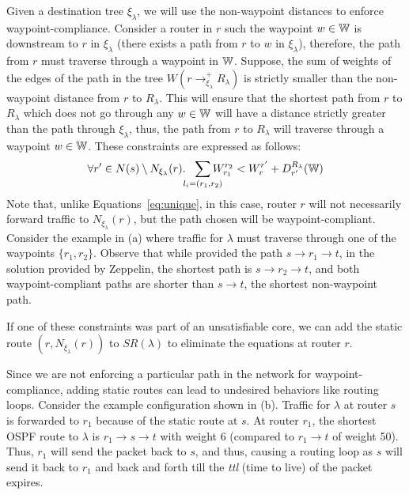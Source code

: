 Given a destination tree $\xi_\lambda$, we will use the 
non-waypoint distances to enforce waypoint-compliance. Consider a 
router in $r$ such the waypoint $w \in \mathbb{W}$ is downstream to $r$ in $\xi_\lambda$
(there exists a path from $r$ to $w$ in $\xi_\lambda$), therefore,
the path from $r$ must traverse through 
a waypoint in $\mathbb{W}$.  
Suppose, the sum of weights of the edges of
the path in the tree $W(r \rightarrow^+_{\xi_\lambda} R_\lambda)$  
is strictly smaller than the non-waypoint 
distance from $r$ to $R_\lambda$. This will ensure that 
the shortest path from $r$ to $R_\lambda$ which does not go through
any $w \in \mathbb{W}$ will have a distance strictly greater than the path through
$\xi_\lambda$, thus, the path from $r$ to $R_\lambda$ will traverse
through a waypoint $w \in \mathbb{W}$. These constraints are expressed as follows:
\begin{equation} \label{eq:waypoint}
\forall r' \in N(s) \setminus N_{\xi_\lambda}(r).~~ \sum_{\mathclap{\substack{l_i=(r_1,r_2)}}} 
W_{r_1}^{r_2} < 
W_{r}^{r'}+ D_{r'}^{R_\lambda}(\waypt) 
\end{equation}
Note that, unlike Equations~\ref{eq:unique}, in this case, 
router $r$ will not necessarily forward traffic to  
$N_{\xi_\lambda}(r)$, but the path chosen will be waypoint-compliant. 
Consider the example in (a) where traffic for
$\lambda$ must traverse through one of the waypoints $\{r_1, r_2\}$. 
Observe that while \genesis provided the path $s \rightarrow 
r_1 \rightarrow t$, in the solution provided by Zeppelin, 
the shortest path is $s \rightarrow r_2
\rightarrow t$, and both waypoint-compliant paths are shorter 
than $s \rightarrow t$, the shortest non-waypoint path.

If one of these constraints was part of an unsatisfiable  
core, we can add the static route $(r, N_{\xi_\lambda}(r))$ to
$SR(\lambda)$ to eliminate the equations at router $r$. 

 \label{sec:loopavoidance}
Since we are not enforcing a particular path in the network for waypoint-
compliance, adding
static routes can lead to undesired behaviors like routing loops.  
Consider the example configuration shown in (b). 
Traffic for $\lambda$ at router $s$ is forwarded to $r_1$ because of the
static route at $s$. At router $r_1$, the shortest OSPF route to
$\lambda$ is $r_1 \rightarrow s \rightarrow t$ with weight 6 (compared 
to $r_1 \rightarrow t$ of weight 50). Thus, $r_1$ will send the 
packet back to $s$, and thus, causing a routing loop as $s$ will send
it back to $r_1$ and back and forth till the \emph{ttl} (time to live) of the
packet expires. 

